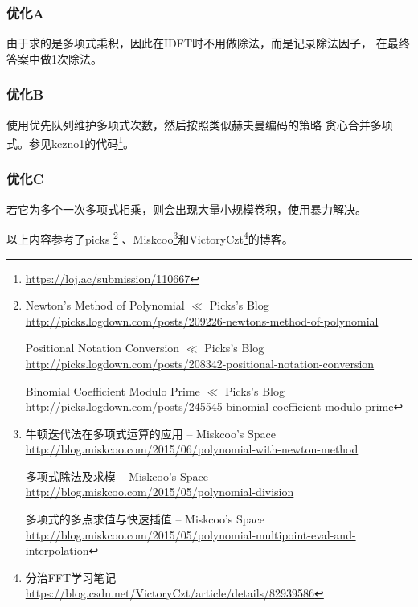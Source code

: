 \subsubsection{优化A} 由于求的是多项式乘积，因此在IDFT时不用做除法，而是记录除法因子，
在最终答案中做1次除法。

\subsubsection{优化B} 使用优先队列维护多项式次数，然后按照类似赫夫曼编码的策略
贪心合并多项式。参见kczno1的代码\footnote{\url{https://loj.ac/submission/110667}}。

\subsubsection{优化C} 若它为多个一次多项式相乘，则会出现大量小规模卷积，使用暴力解决。

以上内容参考了picks
\footnote{
Newton's Method of Polynomial $\ll$ Picks's Blog
\\\url{http://picks.logdown.com/posts/209226-newtons-method-of-polynomial}

Positional Notation Conversion $\ll$ Picks's Blog
\\\url{http://picks.logdown.com/posts/208342-positional-notation-conversion}

Binomial Coefficient Modulo Prime $\ll$ Picks's Blog
\\\url{http://picks.logdown.com/posts/245545-binomial-coefficient-modulo-prime}

}
、Miskcoo\footnote{
牛顿迭代法在多项式运算的应用 – Miskcoo's Space
\\\url{http://blog.miskcoo.com/2015/06/polynomial-with-newton-method}

多项式除法及求模 – Miskcoo's Space
\\\url{http://blog.miskcoo.com/2015/05/polynomial-division}

多项式的多点求值与快速插值 – Miskcoo's Space
\\\url{http://blog.miskcoo.com/2015/05/polynomial-multipoint-eval-and-interpolation}
}和VictoryCzt\footnote{
    分治FFT学习笔记
    \url{https://blog.csdn.net/VictoryCzt/article/details/82939586}
}的博客。
